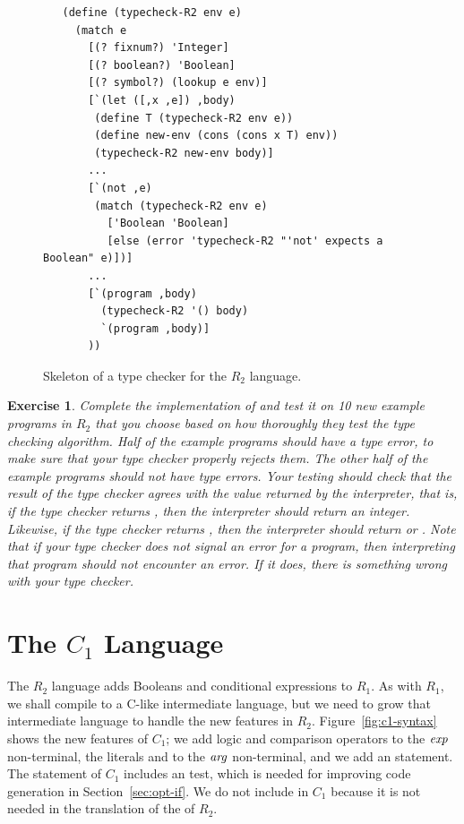 \documentclass[11pt]{book}
\newtheorem{exercise}[theorem]{Exercise}
\begin{document}
\begin{figure}[tbp]
\begin{lstlisting}
   (define (typecheck-R2 env e)
     (match e
       [(? fixnum?) 'Integer]
       [(? boolean?) 'Boolean]
       [(? symbol?) (lookup e env)]
       [`(let ([,x ,e]) ,body)
        (define T (typecheck-R2 env e))
        (define new-env (cons (cons x T) env))
        (typecheck-R2 new-env body)]
       ...
       [`(not ,e)
        (match (typecheck-R2 env e)
          ['Boolean 'Boolean]
          [else (error 'typecheck-R2 "'not' expects a Boolean" e)])]
       ...
       [`(program ,body)
         (typecheck-R2 '() body)
         `(program ,body)]
       ))
\end{lstlisting}
\caption{Skeleton of a type checker for the $R_2$ language.}
\label{fig:type-check-R2}
\end{figure}

\begin{exercise}\normalfont
Complete the implementation of  and test it on 10
new example programs in $R_2$ that you choose based on how thoroughly
they test the type checking algorithm. Half of the example programs
should have a type error, to make sure that your type checker properly
rejects them. The other half of the example programs should not have
type errors. Your testing should check that the result of the type
checker agrees with the value returned by the interpreter, that is, if
the type checker returns , then the interpreter should
return an integer. Likewise, if the type checker returns
, then the interpreter should return  or
. Note that if your type checker does not signal an error
for a program, then interpreting that program should not encounter an
error.  If it does, there is something wrong with your type checker.
\end{exercise}

\section{The $C_1$ Language}
\label{sec:c1}

The $R_2$ language adds Booleans and conditional expressions to $R_1$.
As with $R_1$, we shall compile to a C-like intermediate language, but
we need to grow that intermediate language to handle the new features
in $R_2$. Figure~\ref{fig:c1-syntax} shows the new features of $C_1$;
we add logic and comparison operators to the $\mathit{exp}$ non-terminal, the
literals  and  to the $\mathit{arg}$ non-terminal, and we
add an  statement. The  statement of $C_1$ includes an
 test, which is needed for improving code generation in
Section~\ref{sec:opt-if}.  We do not include  in $C_1$
because it is not needed in the translation of the  of $R_2$.
\end{document}
